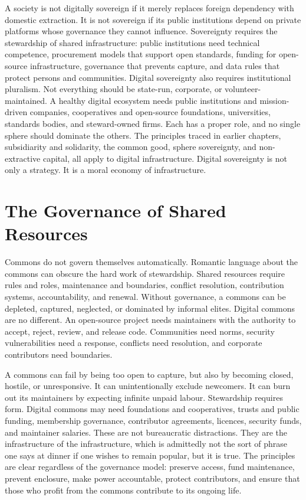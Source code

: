 \documentclass[11pt,a4paper,oneside]{book}
\begin{document}
A society is not digitally sovereign if it merely replaces foreign dependency with domestic extraction. It is not sovereign if its public institutions depend on private platforms whose governance they cannot influence. Sovereignty requires the stewardship of shared infrastructure: public institutions need technical competence, procurement models that support open standards, funding for open-source infrastructure, governance that prevents capture, and data rules that protect persons and communities. Digital sovereignty also requires institutional pluralism. Not everything should be state-run, corporate, or volunteer-maintained. A healthy digital ecosystem needs public institutions and mission-driven companies, cooperatives and open-source foundations, universities, standards bodies, and steward-owned firms. Each has a proper role, and no single sphere should dominate the others. The principles traced in earlier chapters, subsidiarity and solidarity, the common good, sphere sovereignty, and non-extractive capital, all apply to digital infrastructure. Digital sovereignty is not only a strategy. It is a moral economy of infrastructure.

\section*{The Governance of Shared Resources}

Commons do not govern themselves automatically. Romantic language about the commons can obscure the hard work of stewardship. Shared resources require rules and roles, maintenance and boundaries, conflict resolution, contribution systems, accountability, and renewal. Without governance, a commons can be depleted, captured, neglected, or dominated by informal elites. Digital commons are no different. An open-source project needs maintainers with the authority to accept, reject, review, and release code. Communities need norms, security vulnerabilities need a response, conflicts need resolution, and corporate contributors need boundaries.

A commons can fail by being too open to capture, but also by becoming closed, hostile, or unresponsive. It can unintentionally exclude newcomers. It can burn out its maintainers by expecting infinite unpaid labour. Stewardship requires form. Digital commons may need foundations and cooperatives, trusts and public funding, membership governance, contributor agreements, licences, security funds, and maintainer salaries. These are not bureaucratic distractions. They are the infrastructure of the infrastructure, which is admittedly not the sort of phrase one says at dinner if one wishes to remain popular, but it is true. The principles are clear regardless of the governance model: preserve access, fund maintenance, prevent enclosure, make power accountable, protect contributors, and ensure that those who profit from the commons contribute to its ongoing life.
\end{document}
